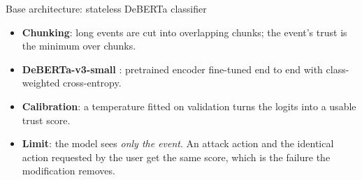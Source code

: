 \documentclass[aspectratio=169,10pt]{beamer}
\begin{document}
\begin{frame}{Base architecture: stateless DeBERTa classifier}
  \centering
  \vspace{3mm}
  \begin{itemize}\small
    \item \textbf{Chunking}: long events are cut into overlapping chunks; the event's trust is the minimum over chunks.
    \item \textbf{DeBERTa-v3-small} \cite{he2021}: pretrained encoder fine-tuned end to end with class-weighted cross-entropy.
    \item \textbf{Calibration}: a temperature fitted on validation turns the logits into a usable trust score.
    \item \textbf{Limit}: the model sees \emph{only the event}. An attack action and the identical action requested by the user get the same score, which is the failure the modification removes.
  \end{itemize}
\end{frame}
\end{document}
